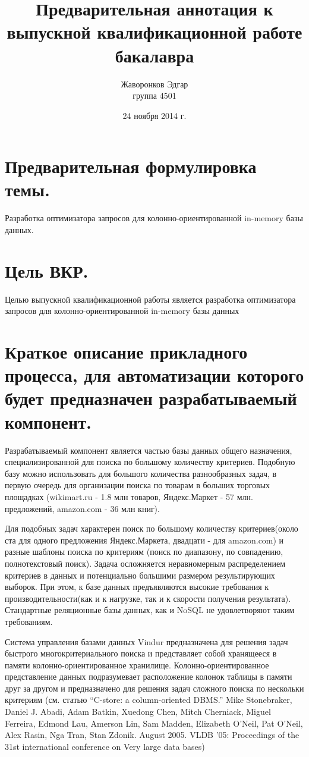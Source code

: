 \documentclass[12pt]{article}
\author{Жаворонков Эдгар \\ группа 4501}
\title{Предварительная аннотация к выпускной квалификационной работе бакалавра}
\date{24 ноября 2014 г.}
\begin{document}
    \section{Предварительная формулировка темы.}
        Разработка оптимизатора запросов для колонно-ориентированной in-memory базы данных.
    \section{Цель ВКР.}
        Целью выпускной квалификационной работы является разработка оптимизатора запросов для колонно-ориентированной in-memory базы данных
    \section{Краткое описание прикладного процесса, для автоматизации которого будет предназначен разрабатываемый компонент.}
        Разрабатываемый компонент является частью базы данных общего назначения, специализированной для поиска по большому количеству критериев. Подобную базу можно использовать для большого количества разнообразных задач, в первую очередь для организации поиска по товарам в больших торговых площадках (wikimart.ru - 1.8 млн товаров, Яндекс.Маркет - 57 млн. предложений, amazon.com - 36 млн книг).

        Для подобных задач характерен поиск по большому количеству критериев(около ста для одного предложения Яндекс.Маркета, двадцати - для amazon.com) и разные шаблоны поиска по критериям (поиск по диапазону, по совпадению, полнотекстовый поиск). Задача осложняется неравномерным распределением критериев в данных и потенциально большими размером результирующих выборок. При этом, к базе данных предъявляются высокие требования к производительности(как и к нагрузке, так и к скорости получения результата). Стандартные реляционные базы данных, как и NoSQL не удовлетворяют таким требованиям.

        Система управления базами данных Vindur предназначена для решения задач быстрого многокритериального поиска и представляет собой хранящееся в памяти колонно-ориентированное хранилище. Колонно-ориентированное представление данных подразумевает расположение колонок таблицы в памяти друг за другом и предназначено для решения задач сложного поиска по нескольки критериям  (см. статью ``C-store: a column-oriented DBMS.'' Mike Stonebraker, Daniel J. Abadi, Adam Batkin, Xuedong Chen, Mitch Cherniack, Miguel Ferreira, Edmond Lau, Amerson Lin, Sam Madden, Elizabeth O'Neil, Pat O'Neil, Alex Rasin, Nga Tran, Stan Zdonik. August 2005. VLDB '05: Proceedings of the 31st international conference on Very large data bases)     
\end{document}
